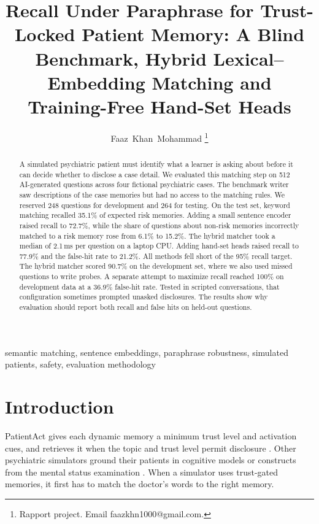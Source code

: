 \documentclass[journal]{IEEEtran}
\begin{document}
\raggedbottom

\title{Recall Under Paraphrase for Trust-Locked Patient Memory: A Blind Benchmark, Hybrid Lexical--Embedding Matching and Training-Free Hand-Set Heads}

\author{Faaz~Khan~Mohammad%
\thanks{Rapport project. Email faazkhn1000@gmail.com.}}

\maketitle

\begin{abstract}
A simulated psychiatric patient must identify what a learner is asking about before it can decide whether to disclose a case detail.
We evaluated this matching step on 512 AI-generated questions across four fictional psychiatric cases. The benchmark writer saw descriptions of the
case memories but had no access to the matching rules. We reserved 248 questions for development and 264 for testing. On the test set,
keyword matching recalled 35.1\% of expected risk memories. Adding a small sentence encoder raised recall to 72.7\%, while the share of
questions about non-risk memories incorrectly matched to a risk memory rose from 6.1\% to 15.2\%. The hybrid matcher took a median of 2.1\,ms per question
on a laptop CPU. Adding hand-set heads raised recall to 77.9\% and the false-hit rate to 21.2\%. All methods fell short of the 95\% recall
target. The hybrid matcher scored 90.7\% on the development set, where we also used missed questions to write probes. A separate attempt to
maximize recall reached 100\% on development data at a 36.9\% false-hit rate. Tested in scripted conversations, that configuration sometimes
prompted unasked disclosures. The results show why evaluation should report both recall and false hits on held-out questions.
\end{abstract}

\begin{IEEEkeywords}
semantic matching, sentence embeddings, paraphrase robustness, simulated patients, safety, evaluation methodology
\end{IEEEkeywords}

\section{Introduction}
PatientAct gives each dynamic memory a minimum trust level and activation cues, and retrieves it when the topic and trust level
permit disclosure \cite{sabour2026patientact}. Other psychiatric simulators ground their patients in cognitive models or constructs from the
mental status examination \cite{wang2024patient,lee2025psyche}. When a simulator uses trust-gated memories, it first has to match the
doctor's words to the right memory.
\end{document}
